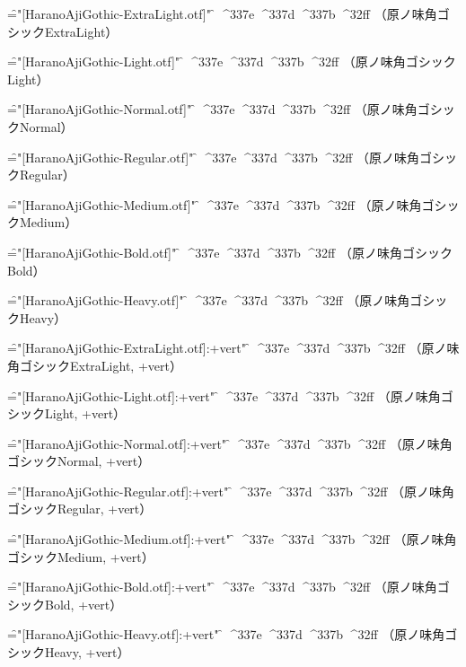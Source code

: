 
\nopagenumbers

\font\f="[HaranoAjiGothic-ExtraLight.otf]" \f
^^^^337e
^^^^337d
^^^^337b
^^^^32ff
（原ノ味角ゴシックExtraLight）\par

\font\f="[HaranoAjiGothic-Light.otf]" \f
^^^^337e
^^^^337d
^^^^337b
^^^^32ff
（原ノ味角ゴシックLight）\par

\font\f="[HaranoAjiGothic-Normal.otf]" \f
^^^^337e
^^^^337d
^^^^337b
^^^^32ff
（原ノ味角ゴシックNormal）\par

\font\f="[HaranoAjiGothic-Regular.otf]" \f
^^^^337e
^^^^337d
^^^^337b
^^^^32ff
（原ノ味角ゴシックRegular）\par

\font\f="[HaranoAjiGothic-Medium.otf]" \f
^^^^337e
^^^^337d
^^^^337b
^^^^32ff
（原ノ味角ゴシックMedium）\par

\font\f="[HaranoAjiGothic-Bold.otf]" \f
^^^^337e
^^^^337d
^^^^337b
^^^^32ff
（原ノ味角ゴシックBold）\par

\font\f="[HaranoAjiGothic-Heavy.otf]" \f
^^^^337e
^^^^337d
^^^^337b
^^^^32ff
（原ノ味角ゴシックHeavy）\par


\font\f="[HaranoAjiGothic-ExtraLight.otf]:+vert" \f
^^^^337e
^^^^337d
^^^^337b
^^^^32ff
（原ノ味角ゴシックExtraLight, +vert）\par

\font\f="[HaranoAjiGothic-Light.otf]:+vert" \f
^^^^337e
^^^^337d
^^^^337b
^^^^32ff
（原ノ味角ゴシックLight, +vert）\par

\font\f="[HaranoAjiGothic-Normal.otf]:+vert" \f
^^^^337e
^^^^337d
^^^^337b
^^^^32ff
（原ノ味角ゴシックNormal, +vert）\par

\font\f="[HaranoAjiGothic-Regular.otf]:+vert" \f
^^^^337e
^^^^337d
^^^^337b
^^^^32ff
（原ノ味角ゴシックRegular, +vert）\par

\font\f="[HaranoAjiGothic-Medium.otf]:+vert" \f
^^^^337e
^^^^337d
^^^^337b
^^^^32ff
（原ノ味角ゴシックMedium, +vert）\par

\font\f="[HaranoAjiGothic-Bold.otf]:+vert" \f
^^^^337e
^^^^337d
^^^^337b
^^^^32ff
（原ノ味角ゴシックBold, +vert）\par

\font\f="[HaranoAjiGothic-Heavy.otf]:+vert" \f
^^^^337e
^^^^337d
^^^^337b
^^^^32ff
（原ノ味角ゴシックHeavy, +vert）\par


